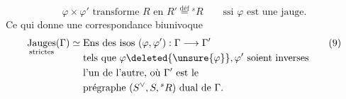 \[
 \varphi\times\varphi'\text{ transforme }R\text{ en }R'\overset{\mathrm{déf}}={}^sR
 \qquad\text{ssi }\varphi\text{ est une jauge.}\tag*{(8)}
\]
Ce qui donne une correspondance biunivoque 
\[
 \underset{\text{strictes}}{\mathrm{Jauges}}(\Gamma)\simeq
 \begin{aligned}[t]&\text{Ens des isos }(\varphi,\varphi'):\Gamma\longrightarrow\Gamma'\\
 &\text{tels que }\varphi\deleted{\unsure{\varphi}},\varphi'\text{ soient inverses}\\
 &\text{l'un de l'autre, où }\Gamma'\text{ est le}\\
 &\text{prégraphe }(S^\vee,S,{}^sR)\text{ dual de }\Gamma.
 \end{aligned}\tag*{(9)}
\]

